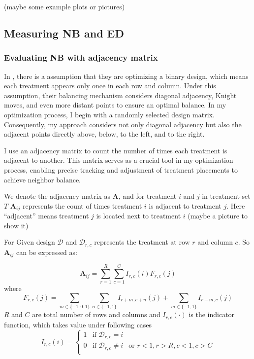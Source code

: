 \documentclass[
  a4paper,
  oneside,
  openany,
  12pt,
  onecolumn]{book}
\theoremstyle{plain}
\theoremstyle{definition}
\theoremstyle{remark}
\begin{document}
(maybe some example plots or pictures)

\subsection{Measuring NB and ED}\label{measuring-nb-and-ed}

\subsubsection{Evaluating NB with adjacency
matrix}\label{evaluating-nb-with-adjacency-matrix}

In \citet{piepho2018neighbor}, there is a assumption that they are
optimizing a binary design, which means each treatment appears only once
in each row and column. Under this assumption, their balancing mechanism
considers diagonal adjacency, Knight moves, and even more distant points
to ensure an optimal balance. In my optimization process, I begin with a
randomly selected design matrix. Consequently, my approach considers not
only diagonal adjacency but also the adjacent points directly above,
below, to the left, and to the right.

I use an adjacency matrix to count the number of times each treatment is
adjacent to another. This matrix serves as a crucial tool in my
optimization process, enabling precise tracking and adjustment of
treatment placements to achieve neighbor balance.

We denote the adjacency matrix as \(\boldsymbol{A}\), and for treatment
\(i\) and \(j\) in treatment set \(T\) \(\boldsymbol{A}_{ij}\)
represents the count of times treatment \(i\) is adjacent to treatment
\(j\). Here ``adjacent'' means treatment \(j\) is located next to
treatment \(i\) (maybe a picture to show it)

For Given design \(\mathcal{D}\) and \(\mathcal{D}_{r,c}\) represents
the treatment at row \(r\) and column \(c\). So \(\boldsymbol{A}_{ij}\)
can be expressed as:

\[
\boldsymbol{A}_{ij}=\sum_{r=1}^{R}\sum_{c=1}^{C}I_{r,c}(i) F_{r,c}(j)
\] where \[
F_{r,c}(j)=
\sum_{m \in \{-1,0,1\}}\sum_{n \in \{-1,1\}}I_{r+m,c+n}(j)+\sum_{m \in \{-1,1\}}I_{r+m,c}(j)
\] \(R\) and \(C\) are total number of rows and columns and
\(I_{r,c}(\cdot)\) is the indicator function, which takes value under
following cases \[
I_{r,c}(i)=
\begin{cases}
1 & \text{if } \mathcal{D}_{r,c}=i \\
0 & \text{if } \mathcal{D}_{r,c}\neq i & \text{or } r<1,r>R,c<1,c>C\\
\end{cases}
\]
\end{document}
